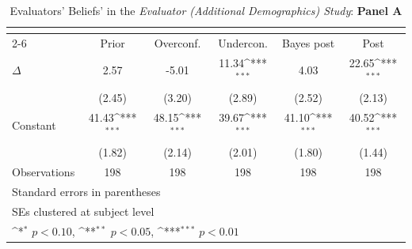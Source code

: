 \begin{table}[htbp]\centering
\def\sym#1{\ifmmode^{#1}\else\(^{#1}\)\fi}
\caption{Evaluators' Beliefs' in the \textit{Evaluator (Additional Demographics) Study}: \textbf{Panel A}}
\begin{tabular}{l*{5}{c}}
\hline\hline
                &\multicolumn{5}{c}{}                                                                          \\\cmidrule(lr){2-6}
                &\multicolumn{1}{c}{Prior}&\multicolumn{1}{c}{Overconf.}&\multicolumn{1}{c}{Undercon.}&\multicolumn{1}{c}{Bayes post}&\multicolumn{1}{c}{Post}\\
\hline
$\Delta$        &     2.57         &    -5.01         &    11.34\sym{***}&     4.03         &    22.65\sym{***}\\
                &   (2.45)         &   (3.20)         &   (2.89)         &   (2.52)         &   (2.13)         \\
Constant        &    41.43\sym{***}&    48.15\sym{***}&    39.67\sym{***}&    41.10\sym{***}&    40.52\sym{***}\\
                &   (1.82)         &   (2.14)         &   (2.01)         &   (1.80)         &   (1.44)         \\
\hline
Observations    &      198         &      198         &      198         &      198         &      198         \\
\hline\hline
\multicolumn{6}{l}{\footnotesize Standard errors in parentheses}\\
\multicolumn{6}{l}{\footnotesize SEs clustered at subject level}\\
\multicolumn{6}{l}{\footnotesize \sym{*} \(p<0.10\), \sym{**} \(p<0.05\), \sym{***} \(p<0.01\)}\\
\end{tabular}
\end{table}
